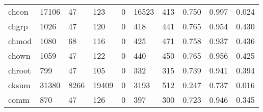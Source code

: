 \begin{longtable}{lp{2.0cm}p{2.0cm}p{2.0cm}p{2.0cm}p{2.0cm}p{2.0cm}p{2.0cm}p{2.0cm}p{2.0cm}}
chcon     &                  17106 &                                 47 &                               123 &                                0 &                             16523 &                             413 &                                0.750 &                                  0.997 &                                0.024 \\
chgrp     &                   1026 &                                 47 &                               120 &                                0 &                               418 &                             441 &                                0.765 &                                  0.954 &                                0.430 \\
chmod     &                   1080 &                                 68 &                               116 &                                0 &                               425 &                             471 &                                0.758 &                                  0.937 &                                0.436 \\
chown     &                   1059 &                                 47 &                               122 &                                0 &                               440 &                             450 &                                0.765 &                                  0.956 &                                0.425 \\
chroot    &                    799 &                                 47 &                               105 &                                0 &                               332 &                             315 &                                0.739 &                                  0.941 &                                0.394 \\
cksum     &                  31380 &                               8266 &                             19409 &                                0 &                              3193 &                             512 &                                0.247 &                                  0.737 &                                0.016 \\
comm      &                    870 &                                 47 &                               126 &                                0 &                               397 &                             300 &                                0.723 &                                  0.946 &                                0.345 \\

\end{longtable}
